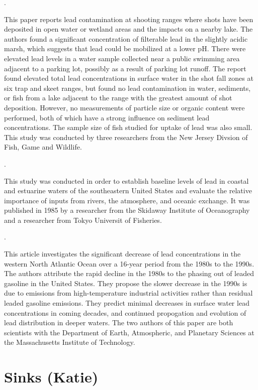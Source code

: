 \documentclass{article}\usepackage[]{graphicx}\usepackage[]{color}
\begin{document}
\noindent {} .


This paper reports lead contamination at shooting ranges where shots have been deposited in open water or wetland areas and the impacts on a nearby lake. The authors found a significant concentration of filterable lead in the slightly acidic marsh, which suggests that lead could be mobilized at a lower pH. There were elevated lead levels in a  water sample collected near a public swimming area adjacent to a parking lot, possibly as a result of parking lot runoff. The report found elevated total lead concentrations in surface water in the shot fall zones at six trap and skeet ranges, but found no lead contamination in water, sediments, or fish from a lake adjacent to the range with the greatest amount of shot deposition. However, no measurements of particle size or organic content were performed, both of which have a strong influence on sediment lead concentrations. The sample size of fish studied for uptake of lead was also small. This study was conducted by three researchers from the New Jersey Divsion of Fish, Game and Wildlife. 


\noindent {} .


This study was conducted in order to establish baseline levels of lead in coastal and estuarine waters of the southeastern United States and evaluate the relative importance of inputs from rivers, the atmosphere, and oceanic exchange. It was published in 1985 by a researcher from the Skidaway Institute of Oceanography and a researcher from Tokyo Universit of Fisheries.


\noindent {} .


This article investigates the significant decrease of lead concentrations in the western North Atlantic Ocean over a 16-year period from the 1980s to the 1990s. The authors attribute the rapid decline in the 1980s to the phasing out of leaded gasoline in the United States. They propose the slower decrease in the 1990s is due to emissions from high-temperature industrial activities rather than residual leaded gasoline emissions. They predict minimal decreases in surface water lead concentrations in coming decades, and continued propogation and evolution of lead distribution in deeper waters. The two authors of this paper are both scientists with the Department of Earth, Atmospheric, and Planetary Sciences at the Massachusetts Institute of Technology.


\section{Sinks (Katie)}
\end{document}
